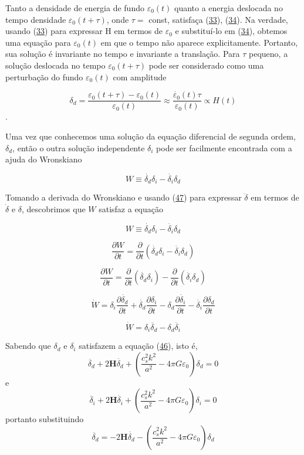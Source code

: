 \documentclass[a4paper,12pt]{article}
\begin{document}
Tanto a densidade de energia de fundo $\varepsilon_0 (t)$ quanto a energia deslocada no tempo
densidade $\varepsilon_0 (t + \tau)$, onde $\tau =$ const, satisfaça (\hyperref[eq33]{33}), (\hyperref[eq34]{34}). Na verdade, usando (\hyperref[eq33]{33})
para expressar H em termos de $\varepsilon_0$ e substituí-lo em (\hyperref[eq34]{34}), obtemos uma equação para $\varepsilon_0 (t)$ em que o tempo não aparece explicitamente. Portanto, sua solução é invariante no tempo e invariante a translação. Para $\tau$ pequeno, a solução deslocada no tempo $\varepsilon_0 (t+ \tau)$ pode ser
considerado como uma perturbação do fundo $\varepsilon_0 (t)$ com amplitude

$$\delta_d = \dfrac{\varepsilon_0 (t+ \tau) -\varepsilon_0 (t) }{\varepsilon_0 (t)} \approx \dfrac{\dot{\varepsilon_0} (t)\tau }{\varepsilon_0 (t)} \propto H(t)$$.

Uma vez que conhecemos uma solução da equação diferencial de segunda ordem, $\delta_d$, então o
outra solução independente $\delta_i$ pode ser facilmente encontrada com a ajuda do Wronskiano

\begin{equation}\label{eq51}
	W \equiv \dot{\delta_d} \delta_i - \dot{\delta_i} \delta_d
\end{equation}

Tomando a derivada do Wronskiano e usando (\hyperref[eq47]{47}) para expressar $\ddot{\delta}$ em termos de $\dot{\delta}$ e $\delta$, descobrimos que $W$ satisfaz a equação


$$W \equiv \dot{\delta_d} \delta_i - \dot{\delta_i} \delta_d$$

$$\dfrac{\partial W }{\partial t}= \dfrac{\partial  }{\partial t}\left(\dot{\delta_d} \delta_i - \dot{\delta_i} \delta_d \right)$$

$$\dfrac{\partial W }{\partial t}= \dfrac{\partial  }{\partial t}\left(\dot{\delta_d} \delta_i  \right)-\dfrac{\partial  }{\partial t}\left(\dot{\delta_i} \delta_d \right)$$

$$\dot{W}= \delta_i\dfrac{\partial  \dot{\delta_d}}{\partial t}+\dot{\delta_d}\dfrac{\partial \delta_i }{\partial t}-\delta_d\dfrac{\partial  \dot{\delta_i} }{\partial t}-\dot{\delta_i}\dfrac{\partial \delta_d }{\partial t}$$

$$\dot{W}= \delta_i\ddot{\delta_d}-\delta_d\ddot{\delta_i}$$

Sabendo que $\delta_d$ e $\delta_i$ satisfazem a equação (\hyperref[eq46]{46}), isto é,
$$\ddot{\delta_d} + 2\mathbf{H}\dot{\delta_d} + \left( \dfrac{c^2_s k^2}{a^2} -4\pi G\varepsilon_0\right)\delta_d = 0 $$
e
$$\ddot{\delta_i} + 2\mathbf{H}\dot{\delta_i} + \left( \dfrac{c^2_s k^2}{a^2} -4\pi G\varepsilon_0\right)\delta_i = 0$$
portanto substituindo 
$$\ddot{\delta_d} = - 2\mathbf{H}\dot{\delta_d} - \left( \dfrac{c^2_s k^2}{a^2} -4\pi G\varepsilon_0\right)\delta_d  $$
\end{document}

